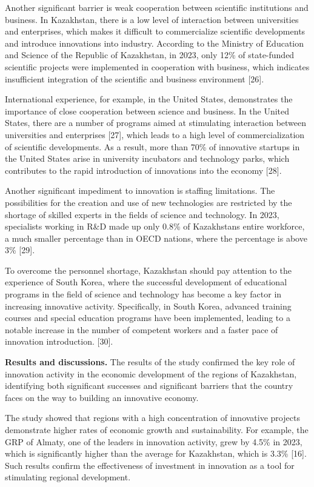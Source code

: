 \begin{multicols}{2}
Another significant barrier is weak cooperation between scientific
institutions and business. In Kazakhstan, there is a low level of
interaction between universities and enterprises, which makes it
difficult to commercialize scientific developments and introduce
innovations into industry. According to the Ministry of Education and
Science of the Republic of Kazakhstan, in 2023, only 12\% of
state-funded scientific projects were implemented in cooperation with
business, which indicates insufficient integration of the scientific and
business environment {[}26{]}.

International experience, for example, in the United States,
demonstrates the importance of close cooperation between science and
business. In the United States, there are a number of programs aimed at
stimulating interaction between universities and enterprises {[}27{]},
which leads to a high level of commercialization of scientific
developments. As a result, more than 70\% of innovative startups in the
United States arise in university incubators and technology parks, which
contributes to the rapid introduction of innovations into the economy
{[}28{]}.

Another significant impediment to innovation is staffing limitations.
The possibilities for the creation and use of new technologies are
restricted by the shortage of skilled experts in the fields of science
and technology. In 2023, specialists working in R\&D made up only 0.8\%
of Kazakhstan\textquotesingle s entire workforce, a much smaller
percentage than in OECD nations, where the percentage is above 3\%
{[}29{]}.

To overcome the personnel shortage, Kazakhstan should pay attention to
the experience of South Korea, where the successful development of
educational programs in the field of science and technology has become a
key factor in increasing innovative activity. Specifically, in South
Korea, advanced training courses and special education programs have
been implemented, leading to a notable increase in the number of
competent workers and a faster pace of innovation introduction.
{[}30{]}.

{\bfseries Results and discussions.} The results of the study confirmed the
key role of innovation activity in the economic development of the
regions of Kazakhstan, identifying both significant successes and
significant barriers that the country faces on the way to building an
innovative economy.

The study showed that regions with a high concentration of innovative
projects demonstrate higher rates of economic growth and sustainability.
For example, the GRP of Almaty, one of the leaders in innovation
activity, grew by 4.5\% in 2023, which is significantly higher than the
average for Kazakhstan, which is 3.3\% {[}16{]}. Such results confirm
the effectiveness of investment in innovation as a tool for stimulating
regional development.


\end{multicols}
